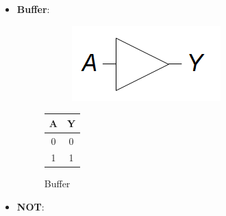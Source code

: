 \documentclass{article}
\begin{document}
\begin{itemize}

\item \textbf{Buffer}:

\begin{figure}[ht]
    \begin{minipage}[t]{0.49\textwidth}
        \centering
        \begin{figure}[H]
        \centering
\includegraphics[width=.55\linewidth]{Buffer.png}
        \end{figure}
        \label{fig:buffer}
    \end{minipage}
    \begin{minipage}[t]{0.49\textwidth}
    \centering
        \begin{table}[H]
        \centering
        \begin{tabular}{c|c}
            A & Y\\
            \hline
            0 & 0\\
            \hline
            1 & 1\\
        \end{tabular}
    \label{tab:buffer}
    \end{table}
\end{minipage}
\caption{Buffer}
\end{figure}

\item \textbf{NOT}:


\end{itemize}
\end{document}

